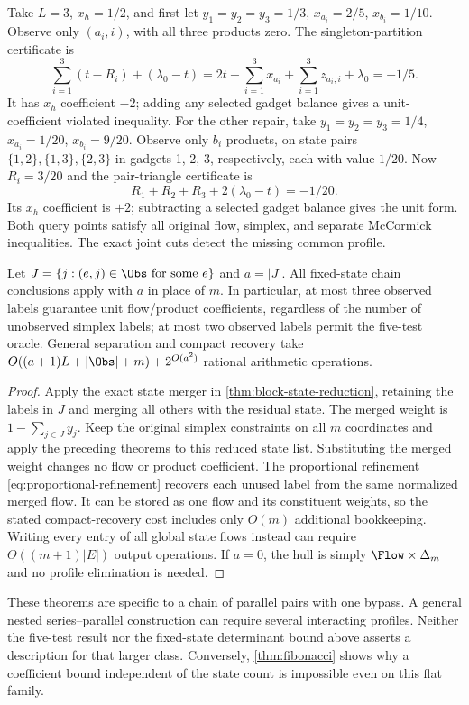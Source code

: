 \begin{example}\label{ex:chain3-repairs}
Take $L=3$, $x_h=1/2$, and first let $y_1=y_2=y_3=1/3$,
$x_{a_i}=2/5$, $x_{b_i}=1/10$. Observe only $(a_i,i)$,
with all three products zero. The singleton-partition certificate is
\[
 \sum_{i=1}^3(t-R_i)+(\lambda_0-t)
   =2t-\sum_{i=1}^3x_{a_i}+\sum_{i=1}^3z_{a_i,i}+\lambda_0
   =-1/5.
\]
It has $x_h$ coefficient $-2$; adding any selected gadget balance
gives a unit-coefficient violated inequality.
For the other repair, take $y_1=y_2=y_3=1/4$,
$x_{a_i}=1/20$, $x_{b_i}=9/20$. Observe only $b_i$ products,
on state pairs $\{1,2\},\{1,3\},\{2,3\}$ in gadgets 1, 2, 3,
respectively, each with value $1/20$. Now $R_i=3/20$ and the
pair-triangle certificate is
\[
 R_1+R_2+R_3+2(\lambda_0-t)=-1/20.
\]
Its $x_h$ coefficient is $+2$; subtracting a selected gadget
balance gives the unit form. Both query points satisfy all original
flow, simplex, and separate McCormick inequalities. The exact
joint cuts detect the missing common profile.
\end{example}

\begin{corollary}\label{cor:chain-observed-labels}
Let $J=\{j:(e,j)\in\Obs\text{ for some }e\}$ and $a=|J|$.
All fixed-state chain conclusions apply with $a$ in place of $m$.
In particular, at most three observed labels guarantee unit flow/product
coefficients, regardless of the number of unobserved simplex labels;
at most two observed labels permit the five-test oracle.
General separation and compact recovery take
$O((a+1)L+|\Obs|+m)+2^{O(a^2)}$ rational arithmetic operations.
\end{corollary}
\begin{proof}
Apply the exact state merger in \cref{thm:block-state-reduction},
retaining the labels in $J$ and merging all others with the residual
state. The merged weight is $1-\sum_{j\in J}y_j$.
Keep the original simplex constraints on all $m$ coordinates and
apply the preceding theorems to this reduced state list. Substituting
the merged weight changes no flow or product coefficient. The
proportional refinement \eqref{eq:proportional-refinement} recovers
each unused label from the same normalized merged flow. It can be
stored as one flow and its constituent weights, so the stated
compact-recovery cost includes only $O(m)$ additional bookkeeping.
Writing every entry of all global state flows instead can require
$\Theta((m+1)|E|)$ output operations. If $a=0$, the hull is simply
$\Flow\times\Delta_m$ and no profile elimination is needed.
\end{proof}

These theorems are specific to a chain of parallel pairs with one bypass.
A general nested series--parallel construction can require several
interacting profiles. Neither the five-test result nor the
fixed-state determinant bound above asserts a description for that
larger class. Conversely, \cref{thm:fibonacci} shows why a coefficient
bound independent of the state count is impossible even on this
flat family.
